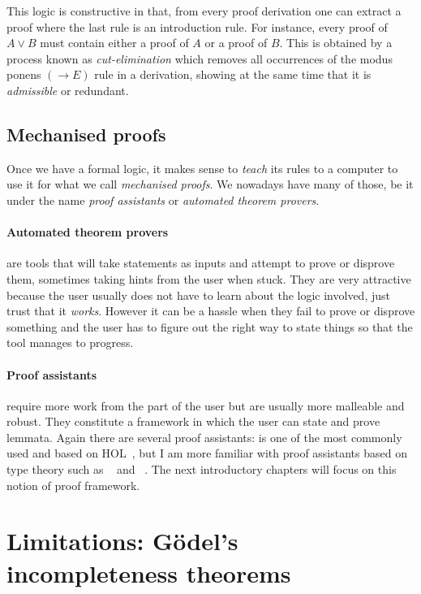This logic is constructive in that, from every proof derivation one can extract
a proof where the last rule is an introduction rule.
For instance, every proof of \(A \vee B\) must contain either a proof of \(A\)
or a proof of \(B\).
This is obtained by a process known as \emph{cut-elimination} which removes all
occurrences of the modus ponens \((\to E)\) rule in a derivation, showing at the
same time that it is \emph{admissible} or redundant.

\subsection{Mechanised proofs}

Once we have a formal logic, it makes sense to \emph{teach} its rules to a
computer to use it for what we call \emph{mechanised proofs}.
We nowadays have many of those, be it under the name \emph{proof assistants} or
\emph{automated theorem provers}.

\paragraph{Automated theorem provers} are tools that will take statements as
inputs and attempt to prove or disprove them, sometimes taking hints from the
user when stuck.
They are very attractive because the user usually does not have to learn about
the logic involved, just trust that it \emph{works}. However it can be a hassle when they fail to prove or disprove
something and the user has to figure out the right way to state things so that
the tool manages to progress.

\paragraph{Proof assistants} require more work from the part of the user but are
usually more malleable and robust. They constitute a framework in which the user
can state and prove lemmata. Again there are several proof assistants: \IsaHOL
is one of the most commonly used and based on
\acrfull{HOL}~, but I am more  familiar with
proof assistants based on type theory such as \Coq~ and
\Agda~.
The next introductory chapters will focus on this notion of proof framework.

\section{Limitations: Gödel's incompleteness theorems}

